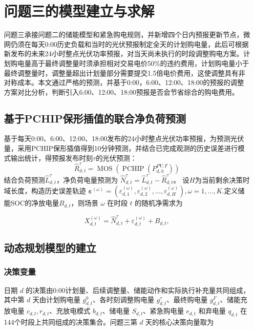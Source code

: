 \documentclass{cumcm2026}
\begin{document}
\section{问题三的模型建立与求解}
问题三承接问题二的储能模型和紧急购电规则，并新增四个日内预报更新节点，微网仍须在每天0:00历史负载和当时的光伏预报制定全天的计划购电量，此后可根据新发布的未来24小时整点光伏功率预报，对当天尚未执行的时段调整购电方案。计划购电量高于最终调整量时须承担相对交易电价50\%的违约费用，计划购电量小于最终调整量时，调整量超出计划量部分需要提交1.5倍电价费用，这使调整具有非对称成本。本文通过严格的预测，并基于0:00，6:00、12:00、18:00的预报的调整方案对比分析，判断引入6:00、12:00、18:00预报是否会节省综合的购电费用。
\subsection{基于PCHIP保形插值的联合净负荷预测}
基于每天0:00、6:00、12:00、18:00发布的24小时整点光伏功率预报，为预测光伏量，采用PCHIP保形插值得到10分钟预测，并结合已完成观测的历史误差进行模式输出统计，得预报发布时刻$\tau$的光伏预测：
$$\widehat{R}_{d, t}^{\tau}=\operatorname{MOS}\left(\operatorname{PCHIP}\left(P_{d, h}^{P V, F}\right)\right)$$
结合负荷预测$\widehat L_{d,t}^{\tau}$，净负荷电量预测为 $\widehat N_{d,t}^{\tau}=\widehat L_{d,t}^{\tau}-\widehat R_{d,t}^{\tau}$。
设$H$为当前剩余决策时域长度，构造历史误差轨迹
$
\boldsymbol{\varepsilon}^{(\omega)}
=\left(\varepsilon_{d,1}^{(\omega)},\varepsilon_{d,2}^{(\omega)},\ldots,\varepsilon_{d,H}^{(\omega)}\right),
\omega=1,\ldots,K
$.定义储能SOC的净放电量$B_{d,t}$，则场景 $\omega$ 在时段 $t$ 的随机净需求为

\begin{equation}
X_{d,t}^{(\omega)}
=\widehat N_{d,t}^{\tau}
+\varepsilon_{d,t}^{(\omega)}
+B_{d,t},
\end{equation}

\subsection{动态规划模型的建立}
\subsubsection{决策变量}
日期 $d$ 的决策由0:00计划量、后续调整量、储能动作和实际执行补充量共同组成，其中第 $d$ 天由计划购电量 $g_{d,t}^{0}$、各时刻调整购电量 $g_{d,t}^{\tau}$、最终购电量 $g_{d,t}^{F}$、储能充放电量 $c_{d,t},r_{d,t}$、充放电模式 $b_{d,t}$、储电量 $S_{d,t}$、紧急购电量 $e_{d,t}$ 和弃电量 $q_{d,t}$ 在144个时段上共同组成的决策集合。问题三第 $d$ 天的核心决策向量取为
\end{document}
